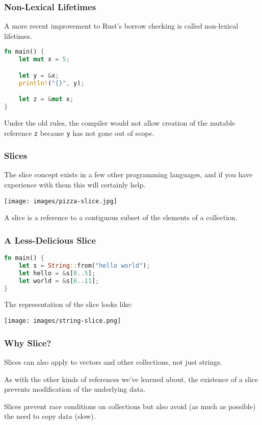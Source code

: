 \begin{frame}[fragile]
\frametitle{Non-Lexical Lifetimes}

A more recent improvement to Rust's borrow checking is called non-lexical lifetimes.

\begin{lstlisting}[language=Rust]
fn main() {
    let mut x = 5;

    let y = &x;
    println!("{}", y);

    let z = &mut x;
}
\end{lstlisting}

Under the old rules, the compiler would not allow creation of the mutable reference \texttt{z} because \texttt{y} has not gone out of scope.

\end{frame}


\begin{frame}
\frametitle{Slices}

The \alert{slice} concept exists in a few other programming languages, and if you have experience with them this will certainly help.

\begin{center}
	\texttt{[image: images/pizza-slice.jpg]}
\end{center}

A slice is a reference to a contiguous subset of the elements of a collection. 

\end{frame}


\begin{frame}[fragile]
\frametitle{A Less-Delicious Slice}

\begin{lstlisting}[language=Rust]
fn main() {
    let s = String::from("hello world");
    let hello = &s[0..5];
    let world = &s[6..11];
}
\end{lstlisting}

The representation of the slice looks like:
\begin{center}
	\texttt{[image: images/string-slice.png]}
\end{center}

\end{frame}


\begin{frame}
\frametitle{Why Slice?}

Slices can also apply to vectors and other collections, not just strings. 

As with the other kinds of references we've learned about, the existence of a slice prevents modification of the underlying data. 

Slices prevent race conditions on collections but also avoid (as much as possible) the need to copy data (slow).

\end{frame}


